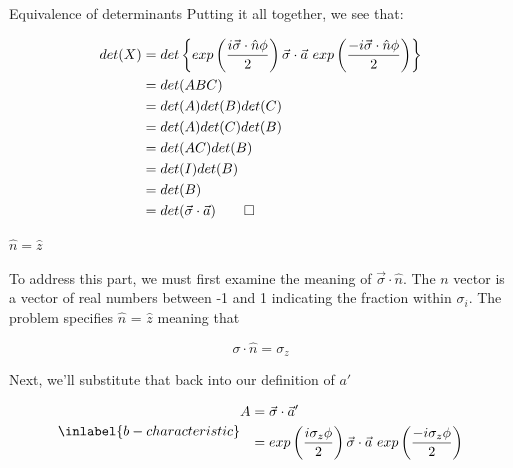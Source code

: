 \begin{answer}
\begin{answerpart}{Equivalence of determinants}
    Putting it all together, we see that:
    
    \begin{equation}
      \begin{split}
        det(X)
        &= det \left\{ exp \left( \frac{i\vec{\sigma} \cdot \hat{n}\phi}{2}\right)
        \vec{\sigma} \cdot \vec{a} \ 
        exp \left( \frac{-i\vec{\sigma} \cdot \hat{n}\phi}{2}\right) \right\}\\
        &= det(ABC) \\
        &= det(A)det(B)det(C) \\
        &= det(A)det(C)det(B) \\
        &= det(AC)det(B) \\
        &= det(I)det(B) \\
        &= det(B) \\
        &= det(\vec{\sigma} \cdot \vec{a})
        \qed\\
      \end{split}
    \end{equation}

  \end{answerpart}



  \begin{answerpart}{\texorpdfstring{$\hat{n} = \hat{z}$}{n = z}}

    To address this part, we must first examine the meaning of
    $\vec{\sigma} \cdot \hat{n}$.  The $n$ vector is a vector of real
    numbers between -1 and 1 indicating the fraction within
    $\sigma_i$.  The problem specifies $\hat{n}$ = $\hat{z}$ meaning
    that

    \begin{equation}
      \sigma \cdot \hat{n} = \sigma_z
    \end{equation}

    Next, we'll substitute that back into our definition of $a'$

    \begin{equation}
      \inlabel{b-characteristic}
      \begin{split}
        A &=
        \vec{\sigma} \cdot \vec{a}' \\
        &= exp \left( \frac{i\sigma_z\phi}{2}\right)
        \vec{\sigma} \cdot \vec{a} \ 
        exp \left( \frac{-i\sigma_z\phi}{2}\right)\\
      \end{split}
    \end{equation}


\end{answerpart}
\end{answer}
